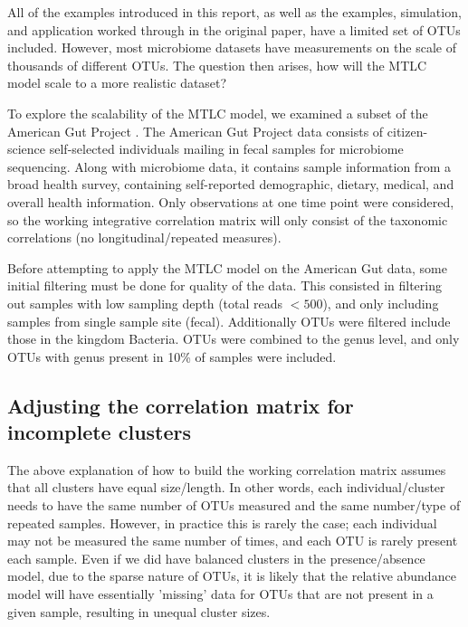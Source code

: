 \documentclass[12pt]{article}
\begin{document}
All of the examples introduced in this report, as well as the examples, simulation, and application worked through in the original paper, have a limited set of OTUs included. However, most microbiome datasets have measurements on the scale of thousands of different OTUs. The question then arises, how will the MTLC model scale to a more realistic dataset?

To explore the scalability of the MTLC model, we examined a subset of the American Gut Project \cite{mayer2015gut}. The American Gut Project data consists of citizen-science self-selected individuals mailing in fecal samples for microbiome sequencing. Along with microbiome data, it contains sample information from a broad health survey, containing self-reported demographic, dietary, medical, and overall health information. Only observations at one time point were considered, so the working integrative correlation matrix will only consist of the taxonomic correlations (no longitudinal/repeated measures).

Before attempting to apply the MTLC model on the American Gut data, some initial filtering must be done for quality of the data. This consisted in filtering out samples with low sampling depth (total reads $< 500$), and only including samples from single sample site (fecal). Additionally OTUs were filtered include those in the kingdom Bacteria. OTUs were combined to the genus level, and only OTUs with genus present in 10\% of samples were included.



\subsection{Adjusting the correlation matrix for incomplete clusters}
The above explanation of how to build the working correlation matrix assumes that all clusters have equal size/length. In other words, each individual/cluster needs to have the same number of OTUs measured and the same number/type of repeated samples. However, in practice this is rarely the case; each individual may not be measured the same number of times, and each OTU is rarely present each sample. Even if we did have balanced clusters in the presence/absence model, due to the sparse nature of OTUs, it is likely that the relative abundance model will have essentially 'missing' data for OTUs that are not present in a given sample, resulting in unequal cluster sizes.
\end{document}
